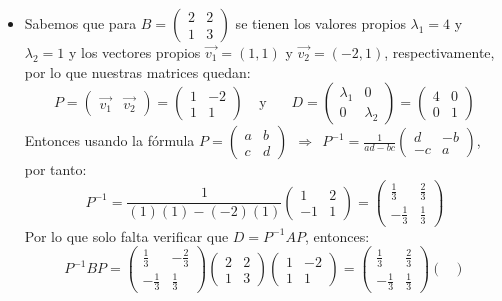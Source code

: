 \begin{itemize}
\begin{itemize}
\item Sabemos que para $\displaystyle B= \begin{pmatrix}
2 &2\\
1 &3
\end{pmatrix}$ se tienen los valores propios $\lambda_1=4$ y $\lambda_2=1$ y los vectores propios $\vec{v_1}=(1,1)$ y $\vec{v_2}=(-2,1)$, respectivamente, por lo que nuestras matrices quedan:
\[P=\begin{pmatrix}\vec{v_1}&\vec{v_2}\end{pmatrix}=\begin{pmatrix}1&-2\\1&1\end{pmatrix}~~~~~\text{y}~~~~~~~~D=\begin{pmatrix}\lambda_1&0\\0&\lambda_2\end{pmatrix}=\begin{pmatrix}4&0\\0&1\end{pmatrix}\]
Entonces usando la f\'ormula $\displaystyle P=\begin{pmatrix}a&b\\c&d\end{pmatrix}~~\Longrightarrow~~P^{-1}=\frac{1}{ad-bc}\begin{pmatrix}d&-b\\-c&a\end{pmatrix}$, por tanto:
\[P^{-1}=\frac{1}{(1)(1)-(-2)(1)}\begin{pmatrix}1&2\\-1&1\end{pmatrix}=\begin{pmatrix}\frac{1}{3}&\frac{2}{3}\\-\frac{1}{3}&\frac{1}{3}\end{pmatrix}\]
Por lo que solo falta verificar que $D = P^{-1}AP$, entonces:
\[P^{-1}BP=\begin{pmatrix}\frac{1}{3}&-\frac{2}{3}\\-\frac{1}{3}&\frac{1}{3}\end{pmatrix}\begin{pmatrix}
2 &2\\
1 &3
\end{pmatrix}\begin{pmatrix}1&-2\\1&1\end{pmatrix}=\begin{pmatrix}\frac{1}{3}&\frac{2}{3}\\-\frac{1}{3}&\frac{1}{3}\end{pmatrix}\begin{pmatrix}

\end{pmatrix}\]
\end{itemize}
\end{itemize}
